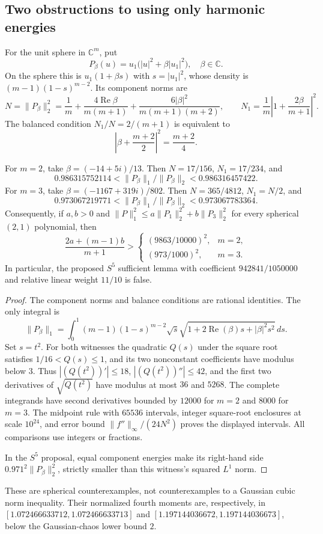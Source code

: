 \subsection{Two obstructions to using only harmonic energies}
For the unit sphere in $\mathbb C^m$, put
\[
 P_\beta(u)=u_1\bigl(|u|^2+\beta|u_1|^2\bigr),\quad \beta\in\mathbb C.
\]
On the sphere this is $u_1(1+\beta s)$ with $s=|u_1|^2$, whose density is $(m-1)(1-s)^{m-2}$. Its component norms are
\[
 N=\|P_\beta\|_2^2=\frac1m+\frac{4\operatorname{Re}\beta}{m(m+1)}
 +\frac{6|\beta|^2}{m(m+1)(m+2)},\qquad
 N_1=\frac1m\left|1+\frac{2\beta}{m+1}\right|^2.
\]
The balanced condition $N_1/N=2/(m+1)$ is equivalent to
\[
 \left|\beta+\frac{m+2}{2}\right|^2=\frac{m+2}{4}.
\]
\begin{proposition}\label{prop:sk-obstruction}
For $m=2$, take $\beta=(-14+5i)/13$. Then $N=17/156$, $N_1=17/234$, and
\[
 0.986315752114<\|P_\beta\|_1/\|P_\beta\|_2<0.986316457422.
\]
For $m=3$, take $\beta=(-1167+319i)/802$. Then $N=365/4812$, $N_1=N/2$, and
\[
 0.973067219771<\|P_\beta\|_1/\|P_\beta\|_2<0.973067783364.
\]
Consequently, if $a,b>0$ and $\|P\|_1^2\le a\|P_1\|_2^2+b\|P_3\|_2^2$ for every spherical $(2,1)$ polynomial, then
\[
 \frac{2a+(m-1)b}{m+1}>
 \begin{cases}(9863/10000)^2,&m=2,\\(973/1000)^2,&m=3.\end{cases}
\]
In particular, the proposed $S^5$ sufficient lemma with coefficient $942841/1050000$ and relative linear weight $11/10$ is false.
\end{proposition}
\begin{proof}
The component norms and balance conditions are rational identities. The only integral is
\[
 \|P_\beta\|_1=\int_0^1(m-1)(1-s)^{m-2}\sqrt{s}\sqrt{1+2\operatorname{Re}(\beta)s+|\beta|^2s^2}\,ds.
\]
Set $s=t^2$. For both witnesses the quadratic $Q(s)$ under the square root satisfies $1/16<Q(s)\le1$, and its two nonconstant coefficients have modulus below $3$. Thus $|(Q(t^2))'|\le18$, $|(Q(t^2))''|\le42$, and the first two derivatives of $\sqrt{Q(t^2)}$ have modulus at most $36$ and $5268$. The complete integrands have second derivatives bounded by $12000$ for $m=2$ and $8000$ for $m=3$. The midpoint rule with $65536$ intervals, integer square-root enclosures at scale $10^{24}$, and error bound $\|f''\|_\infty/(24N^2)$ proves the displayed intervals. All comparisons use integers or fractions.

In the $S^5$ proposal, equal component energies make its right-hand side $0.971^2\|P_\beta\|_2^2$, strictly smaller than this witness's squared $L^1$ norm.
\end{proof}
These are spherical counterexamples, not counterexamples to a Gaussian cubic norm inequality. Their normalized fourth moments are, respectively, in $[1.072466633712,1.072466633713]$ and $[1.197144036672,1.197144036673]$, below the Gaussian-chaos lower bound $2$.

